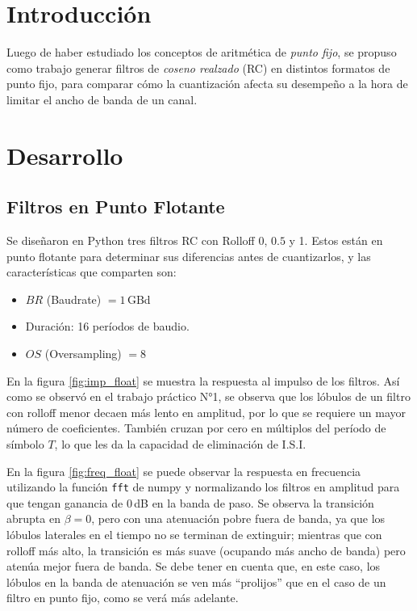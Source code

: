 \section{Introducción}

Luego de haber estudiado los conceptos de aritmética de \emph{punto fijo}, se propuso como trabajo generar filtros de \emph{coseno realzado} (RC) en distintos formatos de punto fijo, para comparar cómo la cuantización afecta su desempeño a la hora de limitar el ancho de banda de un canal.

\section{Desarrollo}

\subsection{Filtros en Punto Flotante}

Se diseñaron en Python tres filtros RC con Rolloff 0, $0.5$ y 1. Estos están en punto flotante para determinar sus diferencias antes de cuantizarlos, y las características que comparten son:

\begin{itemize}
    \item $BR$ (Baudrate) $= 1\,$GBd
    \item Duración: 16 períodos de baudio.
    \item $OS$ (Oversampling) $= 8$
\end{itemize}

En la figura \ref{fig:imp_float} se muestra la respuesta al impulso de los filtros. Así como se observó en el trabajo práctico N°1, se observa que los lóbulos de un filtro con rolloff menor decaen más lento en amplitud, por lo que se requiere un mayor número de coeficientes. También cruzan por cero en múltiplos del período de símbolo $T$, lo que les da la capacidad de eliminación de I.S.I.

En la figura \ref{fig:freq_float} se puede observar la respuesta en frecuencia utilizando la función \texttt{fft} de numpy y normalizando los filtros en amplitud para que tengan ganancia de $0\,$dB en la banda de paso. Se observa la transición abrupta en $\beta=0$, pero con una atenuación pobre fuera de banda, ya que los lóbulos laterales en el tiempo no se terminan de extinguir; mientras que con rolloff más alto, la transición es más suave (ocupando más ancho de banda) pero atenúa mejor fuera de banda. Se debe tener en cuenta que, en este caso, los lóbulos en la banda de atenuación se ven más ``prolijos'' que en el caso de un filtro en punto fijo, como se verá más adelante.

